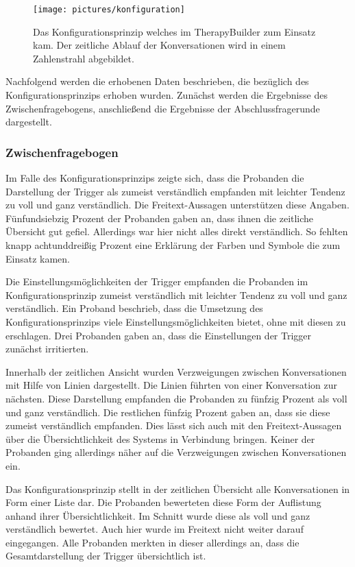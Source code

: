 \begin{figure}[h]
\centering
\texttt{[image: pictures/konfiguration]}
\caption{Das Konfigurationsprinzip welches im TherapyBuilder zum Einsatz kam. Der zeitliche Ablauf der Konversationen wird in einem Zahlenstrahl abgebildet.}
\label{konfiguration}
\end{figure}

Nachfolgend werden die erhobenen Daten beschrieben, die bezüglich des Konfigurationsprinzips erhoben wurden. Zunächst werden die Ergebnisse des Zwischenfragebogens, anschließend die Ergebnisse der Abschlussfragerunde dargestellt.

\subsubsection{Zwischenfragebogen}
Im Falle des Konfigurationsprinzips zeigte sich, dass die Probanden die Darstellung der Trigger als zumeist verständlich empfanden mit leichter Tendenz zu voll und ganz verständlich. Die Freitext-Aussagen unterstützen diese Angaben. Fünfundsiebzig Prozent der Probanden gaben an, dass ihnen die zeitliche Übersicht gut gefiel. Allerdings war hier nicht alles direkt verständlich. So fehlten knapp achtunddreißig Prozent eine Erklärung der Farben und Symbole die zum Einsatz kamen.

Die Einstellungsmöglichkeiten der Trigger empfanden die Probanden im Konfigurationsprinzip zumeist verständlich mit leichter Tendenz zu voll und ganz verständlich. Ein Proband beschrieb, dass die Umsetzung des Konfigurationsprinzips viele Einstellungsmöglichkeiten bietet, ohne mit diesen zu erschlagen. Drei Probanden gaben an, dass die Einstellungen der Trigger zunächst irritierten. 

Innerhalb der zeitlichen Ansicht wurden Verzweigungen zwischen Konversationen mit Hilfe von Linien dargestellt. Die Linien führten von einer Konversation zur nächsten. Diese Darstellung empfanden die Probanden zu fünfzig Prozent als voll und ganz verständlich. Die restlichen fünfzig Prozent gaben an, dass sie diese zumeist verständlich empfanden. Dies lässt sich auch mit den Freitext-Aussagen über die Übersichtlichkeit des Systems in Verbindung bringen. Keiner der Probanden ging allerdings näher auf die Verzweigungen zwischen Konversationen ein.

Das Konfigurationsprinzip stellt in der zeitlichen Übersicht alle Konversationen in Form einer Liste dar. Die Probanden bewerteten diese Form der Auflistung anhand ihrer Übersichtlichkeit. Im Schnitt wurde diese als voll und ganz verständlich bewertet. Auch hier wurde im Freitext nicht weiter darauf eingegangen. Alle Probanden merkten in dieser allerdings an, dass die Gesamtdarstellung der Trigger übersichtlich ist. 


